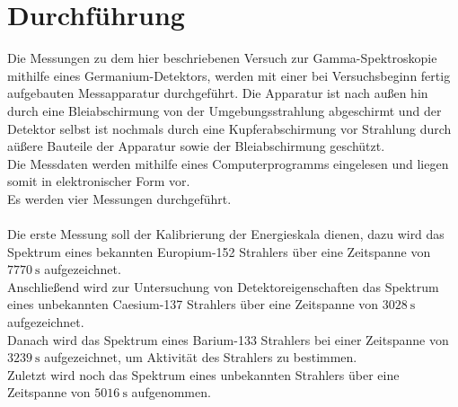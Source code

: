 \section{Durchführung}
\label{sec:Durchführung}
Die Messungen zu dem hier beschriebenen Versuch zur Gamma-Spektroskopie mithilfe eines Germanium-Detektors,
werden mit einer bei Versuchsbeginn fertig aufgebauten Messapparatur durchgeführt.
Die Apparatur ist nach außen hin durch eine Bleiabschirmung von der Umgebungsstrahlung abgeschirmt und der Detektor selbst ist nochmals durch eine Kupferabschirmung vor Strahlung durch aüßere Bauteile der Apparatur sowie der Bleiabschirmung geschützt.\\
Die Messdaten werden mithilfe eines Computerprogramms eingelesen und liegen somit in elektronischer Form vor.\\
Es werden vier Messungen durchgeführt.\\ \\
Die erste Messung soll der Kalibrierung der Energieskala dienen, dazu wird das Spektrum eines bekannten Europium-152
Strahlers über eine Zeitspanne von $\SI{7770}{\second}$ aufgezeichnet.\\
Anschließend wird zur Untersuchung von Detektoreigenschaften das Spektrum eines unbekannten Caesium-137 Strahlers
über eine Zeitspanne von $\SI{3028}{\second}$ aufgezeichnet.\\
Danach wird das Spektrum eines Barium-133 Strahlers bei einer Zeitspanne von $\SI{3239}{\second}$ aufgezeichnet, um
Aktivität des Strahlers zu bestimmen.\\
Zuletzt wird noch das Spektrum eines unbekannten Strahlers über eine Zeitspanne von $\SI{5016}{\second}$ aufgenommen.
